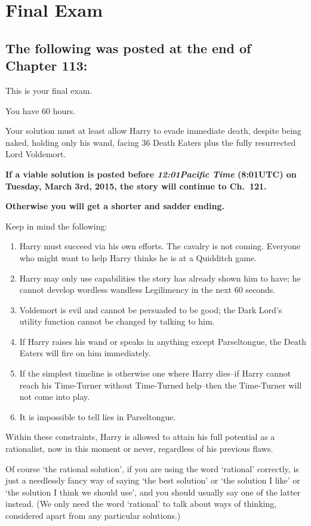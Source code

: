 \chapter{Final Exam}

\section{The following was posted at the end of Chapter 113:}

{%
\setlength{\parindent}{0pt}
\setlength{\parskip}{.5\baselineskip}

This is your final exam.

You have 60 hours.

Your solution must at least allow Harry to evade immediate death, despite being naked, holding only his wand, facing 36 Death Eaters plus the fully resurrected Lord Voldemort.

\textbf{If a viable solution is posted before \emph{12:01\am Pacific Time} (8:01\am UTC) on Tuesday, March 3rd, 2015, the story will continue to Ch.~121.}

\textbf{Otherwise you will get a shorter and sadder ending.}

Keep in mind the following:
\begin{enumerate}
\item Harry must succeed via his own efforts. The cavalry is not coming. Everyone who might want to help Harry thinks he is at a Quidditch game.
\item Harry may only use capabilities the story has already shown him to have; he cannot develop wordless wandless Legilimency in the next 60 seconds.
\item Voldemort is evil and cannot be persuaded to be good; the Dark Lord's utility function cannot be changed by talking to him.
\item If Harry raises his wand or speaks in anything except Parseltongue, the Death Eaters will fire on him immediately.
\item If the simplest timeline is otherwise one where Harry dies\---if Harry cannot reach his Time-Turner without Time-Turned help\---then the Time-Turner will not come into play.
\item It is impossible to tell lies in Parseltongue.
\end{enumerate}
Within these constraints, Harry is allowed to attain his full potential as a rationalist, now in this moment or never, regardless of his previous flaws.

Of course `the rational solution', if you are using the word `rational' correctly, is just a needlessly fancy way of saying `the best solution' or `the solution I like' or `the solution I think we should use', and you should usually say one of the latter instead. (We only need the word `rational' to talk about ways of thinking, considered apart from any particular solutions.)

}

